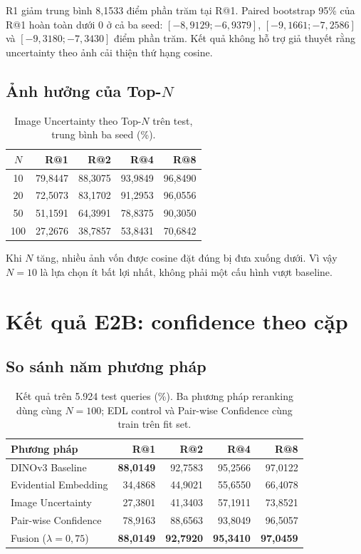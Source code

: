 \documentclass[11pt,a4paper]{article}
\begin{document}
R1 giảm trung bình 8,1533 điểm phần trăm tại R@1. Paired bootstrap 95\% của
R@1 hoàn toàn dưới 0 ở cả ba seed: $[-8{,}9129;-6{,}9379]$,
$[-9{,}1661;-7{,}2586]$ và $[-9{,}3180;-7{,}3430]$ điểm phần trăm. Kết quả
không hỗ trợ giả thuyết rằng uncertainty theo ảnh cải thiện thứ hạng cosine.

\subsection{Ảnh hưởng của Top-$N$}
\begin{table}[H]
\centering
\caption{Image Uncertainty theo Top-$N$ trên test, trung bình ba seed (\%).}
\begin{tabular}{@{}crrrr@{}}
\toprule
$N$ & R@1 & R@2 & R@4 & R@8\\ \midrule
10  & 79,8447 & 88,3075 & 93,9849 & 96,8490\\
20  & 72,5073 & 83,1702 & 91,2953 & 96,0556\\
50  & 51,1591 & 64,3991 & 78,8375 & 90,3050\\
100 & 27,2676 & 38,7857 & 53,8431 & 70,6842\\
\bottomrule
\end{tabular}
\end{table}

Khi $N$ tăng, nhiều ảnh vốn được cosine đặt đúng bị đưa xuống dưới. Vì vậy
$N=10$ là lựa chọn ít bất lợi nhất, không phải một cấu hình vượt baseline.

\section{Kết quả E2B: confidence theo cặp}
\subsection{So sánh năm phương pháp}
\begin{table}[H]
\centering
\caption{Kết quả trên 5.924 test queries (\%). Ba phương pháp reranking dùng
cùng $N=100$; EDL control và Pair-wise Confidence cùng train trên fit set.}
\begin{tabular}{@{}lrrrr@{}}
\toprule
Phương pháp & R@1 & R@2 & R@4 & R@8\\ \midrule
DINOv3 Baseline & \textbf{88,0149} & 92,7583 & 95,2566 & 97,0122\\
Evidential Embedding & 34,4868 & 44,9021 & 55,6550 & 66,4078\\
Image Uncertainty & 27,3801 & 41,3403 & 57,1911 & 73,8521\\
Pair-wise Confidence & 78,9163 & 88,6563 & 93,8049 & 96,5057\\
Fusion ($\lambda=0{,}75$) & \textbf{88,0149} & \textbf{92,7920}
& \textbf{95,3410} & \textbf{97,0459}\\
\bottomrule
\end{tabular}
\end{table}
\end{document}
